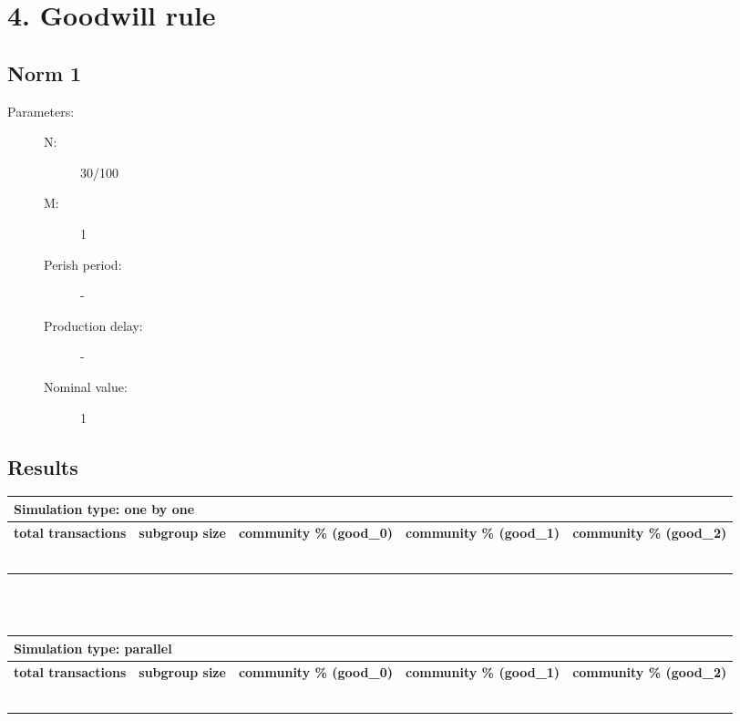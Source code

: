 \documentclass{article}
\begin{document}
\section{4. Goodwill rule}
\subsection{Norm 1}
\begin{description}
  \item[Parameters:] \hfill
	\begin{description}
  		\item[N:] 30/100
		\item[M:] 1
		\item[Perish period:] -
		\item[Production delay:] -
		\item[Nominal value:] 1
	\end{description}

\end{description}

\subsection{Results}
\begin{tabular}{|  l | c | p{2.5cm} | p{2.5cm} | p{2.5cm} | }
     \multicolumn{5}{l}{\textbf{Simulation type: one by one}} \\ \hline
     \textbf{total transactions} & \textbf{subgroup size} & \textbf{community \% (good\_0)} & \textbf{community \% (good\_1)}  & \textbf{community \% (good\_2)} \\ \hline
     &  & & &  \\ \hline
     &  & & & \\ \hline
     &  & & & \\ \hline
     &  & & &  \\ \hline
     &  & & &  \\ \hline
     &  & & & \\ \hline
\end{tabular}
\\
\\
\begin{tabular}{|  l | c | p{2.5cm} | p{2.5cm} | p{2.5cm} | }
     \multicolumn{5}{l}{\textbf{Simulation type: parallel}} \\ \hline
     \textbf{total transactions} & \textbf{subgroup size} & \textbf{community \% (good\_0)} & \textbf{community \% (good\_1)}  & \textbf{community \% (good\_2)} \\ \hline
     &  & & &  \\ \hline
     &  & & & \\ \hline
     &  & & & \\ \hline
     &  & & &  \\ \hline
     &  & & &  \\ \hline
     &  & & & \\ \hline
\end{tabular}
\end{document}
